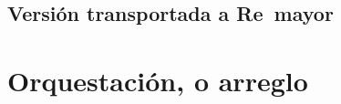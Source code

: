 \subsection[Versión transportada a Re\bemoltxt\ mayor]{Versión transportada a Re\bemol\ mayor}
\label{subsec:transporte-reb}



\section{Orquestación, o arreglo}
\label{sec:orquestacion-arreglo}




%
%
%
